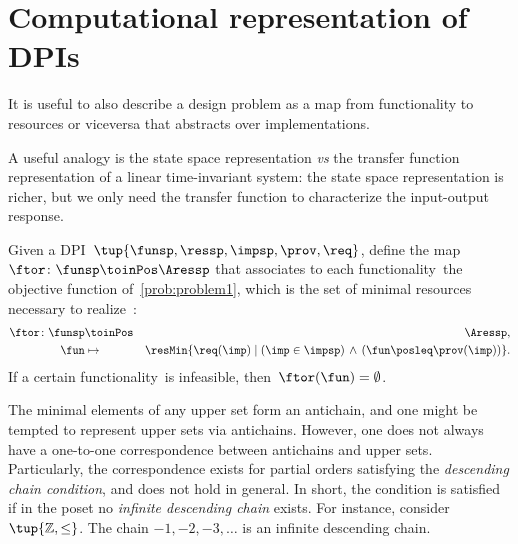 

\section{Computational representation of DPIs}
\label{sec:solving-representation-of-dpis}



It is useful to also describe a design problem as a map from functionality to resources or viceversa that abstracts over implementations.

A useful analogy is the state space representation \emph{vs} the transfer function representation of a linear time-invariant system: the state space representation is richer, but we only need the transfer function to characterize the input-output response.

\begin{definition}
  \label{def:ftor}
  Given a DPI~$\tup{ \funsp,\ressp,\impsp,\prov,\req} $,
  define the map~$\ftor\colon \funsp\toinPos\Aressp$ that associates
  to each functionality~\fun the objective function of~\cref{prob:problem1},
  which is the set of minimal resources necessary to realize~\fun:
  \begin{eqnarray*}
    \ftor\colon \funsp & \toinPos & \Aressp,\\
    \fun& \mapsto & \resMin\{\req(\imp)\mid\left(\imp\in\impsp\right)\,\wedge\,\left(\fun\posleq\prov(\imp)\right)\}.
  \end{eqnarray*}
  If a certain functionality~\fun is infeasible, then~$\ftor(\fun)=\emptyset$.
\end{definition}


\begin{remark}
  The minimal elements of any upper set form an antichain, and one might be tempted to represent upper sets via antichains.
  However, one does not always have a one-to-one correspondence between antichains and upper sets.
  Particularly, the correspondence exists for partial orders satisfying the \emph{descending chain condition}, and does not hold in general.
  In short, the condition is satisfied if in the poset no \emph{infinite descending chain} exists.
  For instance, consider~$\tup{\mathbb{Z},\leq}$. The chain $-1, -2, -3, \ldots$ is an infinite descending chain.
\end{remark}


